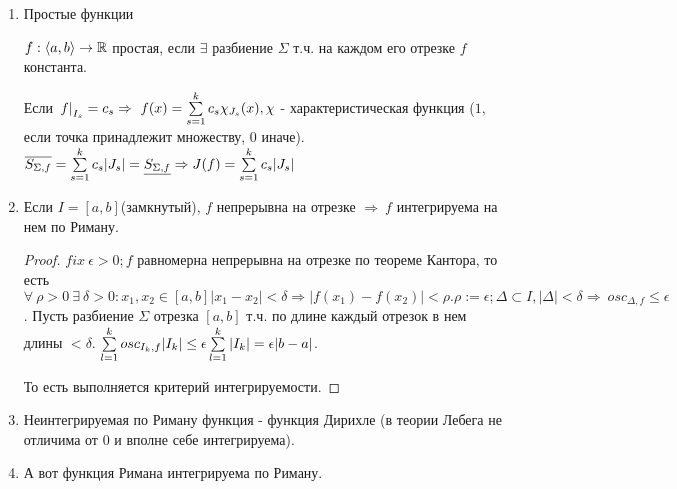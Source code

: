\documentclass[12pt]{report}
\begin{document}
\begin{ex}
\begin{enumerate}
\item Простые функции
\begin{defn}
$f: \left< a, b\right> \to \mathbb{R}$ простая, если $\exists$ разбиение $\Sigma$ т.ч. на каждом его отрезке $f$ константа.
\end{defn}

Если $\left.f\right|_{I_s} = c_s \Rightarrow ~f(x) = \sum\limits_{s = 1}^k{c_s}\chi_{J_s}(x), \chi$ - характеристическая функция ($1$, если точка принадлежит множеству, $0$ иначе). $\overline{S_{\Sigma, f}} = \sum\limits_{s = 1}^k{c_s|J_s|} = \underline{S_{\Sigma, f}} \Rightarrow J(f) = \sum\limits_{s = 1}^k{c_s|J_s|}$

\item 
\begin{thm}
Если $I = [a, b]$(замкнутый), $f$ непрерывна на отрезке $\Rightarrow ~f$ интегрируема на нем по Риману.
\end{thm}
\begin{proof}
$fix ~\epsilon > 0; f$ равномерна непрерывна на отрезке по теореме Кантора, то есть $\forall ~\rho > 0 ~\exists ~\delta >0: x_1, x_2 \in [a, b] |x_1 - x_2| < \delta \Rightarrow |f(x_1) - f(x_2)| < \rho. \rho := \epsilon; \Delta \subset I, |\Delta| < \delta \Rightarrow ~osc_{\Delta, f} \le \epsilon$. Пусть разбиение $\Sigma$ отрезка $[a, b]$ т.ч. по длине каждый отрезок в нем длины $< \delta$. $\sum\limits_{l = 1}^k{osc_{I_k, f} |I_k|} \le \epsilon \sum\limits_{l = 1}^k{|I_k|} = \epsilon |b - a|$.

То есть выполняется критерий интегрируемости.
\end{proof}

\item Неинтегрируемая по Риману функция - функция Дирихле (в теории Лебега не отличима от $0$ и вполне себе интегрируема).
\item А вот функция Римана интегрируема по Риману. 
\end{enumerate}
\end{ex}
\end{document}
